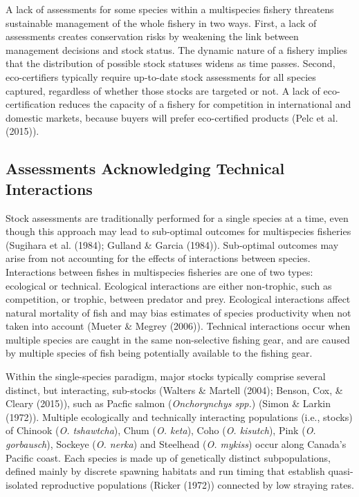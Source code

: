 \documentclass[12pt,]{scrartcl}
\begin{document}
A lack of assessments for some species within a multispecies fishery
threatens sustainable management of the whole fishery in two ways.
First, a lack of assessments creates conservation risks by weakening the
link between management decisions and stock status. The dynamic nature
of a fishery implies that the distribution of possible stock statuses
widens as time passes. Second, eco-certifiers typically require
up-to-date stock assessments for all species captured, regardless of
whether those stocks are targeted or not. A lack of eco-certification
reduces the capacity of a fishery for competition in international and
domestic markets, because buyers will prefer eco-certified products
(Pelc et al. (2015)).

\subsection{Assessments Acknowledging Technical
Interactions}\label{assessments-acknowledging-technical-interactions}

Stock assessments are traditionally performed for a single species at a
time, even though this approach may lead to sub-optimal outcomes for
multispecies fisheries (Sugihara et al. (1984); Gulland \& Garcia
(1984)). Sub-optimal outcomes may arise from not accounting for the
effects of interactions between species. Interactions between fishes in
multispecies fisheries are one of two types: ecological or technical.
Ecological interactions are either non-trophic, such as competition, or
trophic, between predator and prey. Ecological interactions affect
natural mortality of fish and may bias estimates of species productivity
when not taken into account (Mueter \& Megrey (2006)). Technical
interactions occur when multiple species are caught in the same
non-selective fishing gear, and are caused by multiple species of fish
being potentially available to the fishing gear.

Within the single-species paradigm, major stocks typically comprise
several distinct, but interacting, sub-stocks (Walters \& Martell
(2004); Benson, Cox, \& Cleary (2015)), such as Pacfic salmon
(\emph{Onchorynchys spp.}) (Simon \& Larkin (1972)). Multiple
ecologically and technically interacting populations (i.e., stocks) of
Chinook (\emph{O. tshawtcha}), Chum (\emph{O. keta}), Coho (\emph{O.
kisutch}), Pink (\emph{O. gorbausch}), Sockeye (\emph{O. nerka}) and
Steelhead (\emph{O. mykiss}) occur along Canada's Pacific coast. Each
species is made up of genetically distinct subpopulations, defined
mainly by discrete spawning habitats and run timing that establish
quasi-isolated reproductive populations (Ricker (1972)) connected by low
straying rates.
\end{document}

